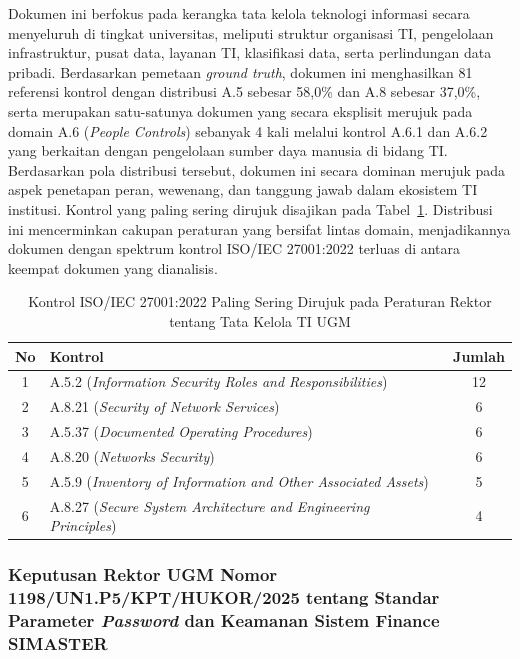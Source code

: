 Dokumen ini berfokus pada kerangka tata kelola teknologi informasi secara menyeluruh di tingkat universitas, meliputi struktur organisasi TI, pengelolaan infrastruktur, pusat data, layanan TI, klasifikasi data, serta perlindungan data pribadi. Berdasarkan pemetaan \textit{ground truth}, dokumen ini menghasilkan 81 referensi kontrol dengan distribusi A.5 sebesar 58,0\% dan A.8 sebesar 37,0\%, serta merupakan satu-satunya dokumen yang secara eksplisit merujuk pada domain A.6 (\textit{People Controls}) sebanyak 4 kali melalui kontrol A.6.1 dan A.6.2 yang berkaitan dengan pengelolaan sumber daya manusia di bidang TI. Berdasarkan pola distribusi tersebut, dokumen ini secara dominan merujuk pada aspek penetapan peran, wewenang, dan tanggung jawab dalam ekosistem TI institusi. Kontrol yang paling sering dirujuk disajikan pada Tabel~\ref{tbl:top_ctrl_tatakelola}. Distribusi ini mencerminkan cakupan peraturan yang bersifat lintas domain, menjadikannya dokumen dengan spektrum kontrol ISO/IEC 27001:2022 terluas di antara keempat dokumen yang dianalisis.

\begin{table}[H]
	\centering
	\caption{Kontrol ISO/IEC 27001:2022 Paling Sering Dirujuk pada Peraturan Rektor tentang Tata Kelola TI UGM}
	\label{tbl:top_ctrl_tatakelola}
	\small
	\begin{tabular}{|c|>{\raggedright\arraybackslash}p{8.5cm}|c|}
		\hline
		\textbf{No} & \textbf{Kontrol} & \textbf{Jumlah} \\
		\hline
		1 & A.5.2 (\textit{Information Security Roles and Responsibilities}) & 12 \\
		\hline
		2 & A.8.21 (\textit{Security of Network Services}) & 6 \\
		\hline
		3 & A.5.37 (\textit{Documented Operating Procedures}) & 6 \\
		\hline
		4 & A.8.20 (\textit{Networks Security}) & 6 \\
		\hline
		5 & A.5.9 (\textit{Inventory of Information and Other Associated Assets}) & 5 \\
		\hline
		6 & A.8.27 (\textit{Secure System Architecture and Engineering Principles}) & 4 \\
		\hline
	\end{tabular}
\end{table}

\subsubsection{Keputusan Rektor UGM Nomor 1198/UN1.P5/KPT/HUKOR/2025 tentang Standar Parameter \textit{Password} dan Keamanan Sistem Finance SIMASTER}

